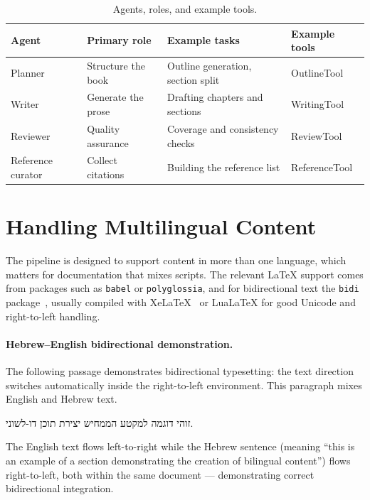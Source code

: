 \begin{table}[htbp]
  \centering
  \caption{Agents, roles, and example tools.}
  \label{tab:agents}
  \begin{tabular}{llll}
    \toprule
    Agent & Primary role & Example tasks & Example tools \\
    \midrule
    Planner & Structure the book & Outline generation, section split &
      OutlineTool \\
    Writer & Generate the prose & Drafting chapters and sections &
      WritingTool \\
    Reviewer & Quality assurance & Coverage and consistency checks &
      ReviewTool \\
    Reference curator & Collect citations & Building the reference list &
      ReferenceTool \\
    \bottomrule
  \end{tabular}
\end{table}

\section{Handling Multilingual Content}

The pipeline is designed to support content in more than one language, which
matters for documentation that mixes scripts. The relevant \LaTeX{} support
comes from packages such as \texttt{babel} or \texttt{polyglossia}, and for
bidirectional text the \texttt{bidi} package~\cite{ctan_bidi}, usually
compiled with XeLaTeX~\cite{tug_xetex} or LuaLaTeX for good Unicode and
right-to-left handling.

\paragraph{Hebrew--English bidirectional demonstration.} The following
passage demonstrates bidirectional typesetting: the text direction switches
automatically inside the right-to-left environment. This paragraph mixes
English and Hebrew text.

\begin{hebrew}
זוהי דוגמה למקטע הממחיש יצירת תוכן דו-לשוני.
\end{hebrew}

The English text flows left-to-right while the Hebrew sentence (meaning
``this is an example of a section demonstrating the creation of bilingual
content'') flows right-to-left, both within the same document ---
demonstrating correct bidirectional integration.
